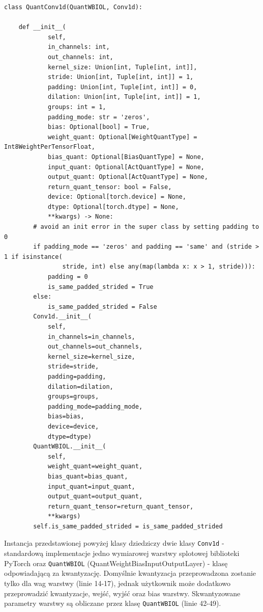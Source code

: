 \documentclass[../main.tex]{subfiles}
\begin{document}
\begin{verbatim}
class QuantConv1d(QuantWBIOL, Conv1d):

    def __init__(
            self,
            in_channels: int,
            out_channels: int,
            kernel_size: Union[int, Tuple[int, int]],
            stride: Union[int, Tuple[int, int]] = 1,
            padding: Union[int, Tuple[int, int]] = 0,
            dilation: Union[int, Tuple[int, int]] = 1,
            groups: int = 1,
            padding_mode: str = 'zeros',
            bias: Optional[bool] = True,
            weight_quant: Optional[WeightQuantType] = Int8WeightPerTensorFloat,
            bias_quant: Optional[BiasQuantType] = None,
            input_quant: Optional[ActQuantType] = None,
            output_quant: Optional[ActQuantType] = None,
            return_quant_tensor: bool = False,
            device: Optional[torch.device] = None,
            dtype: Optional[torch.dtype] = None,
            **kwargs) -> None:
        # avoid an init error in the super class by setting padding to 0
        if padding_mode == 'zeros' and padding == 'same' and (stride > 1 if isinstance(
                stride, int) else any(map(lambda x: x > 1, stride))):
            padding = 0
            is_same_padded_strided = True
        else:
            is_same_padded_strided = False
        Conv1d.__init__(
            self,
            in_channels=in_channels,
            out_channels=out_channels,
            kernel_size=kernel_size,
            stride=stride,
            padding=padding,
            dilation=dilation,
            groups=groups,
            padding_mode=padding_mode,
            bias=bias,
            device=device,
            dtype=dtype)
        QuantWBIOL.__init__(
            self,
            weight_quant=weight_quant,
            bias_quant=bias_quant,
            input_quant=input_quant,
            output_quant=output_quant,
            return_quant_tensor=return_quant_tensor,
            **kwargs)
        self.is_same_padded_strided = is_same_padded_strided
\end{verbatim}

Instancja przedstawionej powyżej klasy dziedziczy dwie klasy \texttt{Conv1d} - standardową implementacje jedno wymiarowej warstwy splotowej biblioteki PyTorch oraz \texttt{QuantWBIOL} (QuantWeightBiasInputOutputLayer) - 
klasę odpowiadającą za kwantyzację. Domyślnie kwantyzacja przeprowadzona zostanie tylko dla wag warstwy (linie 14-17), jednak użytkownik może dodatkowo przeprowadzić kwantyzacje, wejść, wyjść oraz bias warstwy. Skwantyzowane 
parametry warstwy są obliczane przez klasę \texttt{QuantWBIOL} (linie 42-49).
\end{document}
